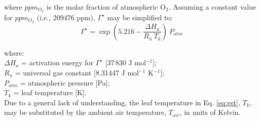 \noindent where $ppm_{O_2}$ is the molar fraction of atmospheric O$_2$. Assuming a constant value for $ppm_{O_2}$ (i.e., 209476 ppm), $\Gamma^\star$ may be simplified to:
\begin{equation}
\label{eq:gstpb}
    \Gamma^\star = \exp \left(5.216 - \frac{\Delta H_a}{R_u\: T_k}\right)\: P_{atm}
\end{equation}

\noindent where:\\
\indent $\Delta H_a$ = activation energy for $\Gamma^\star$ [37$\,$830 J mol$^{-1}$];\\
\indent $R_u$ = universal gas constant [8.31447 J mol$^{-1}$ K$^{-1}$];\\
\indent $P_{atm}$ = atmospheric pressure [Pa];\\
\indent $T_k$ = leaf temperature [K].\\

\noindent Due to a general lack of understanding, the leaf temperature in Eq. \ref{eq:gst}, $T_k$, may be substituted by the ambient air temperature, $T_{air}$, in units of Kelvin. 

